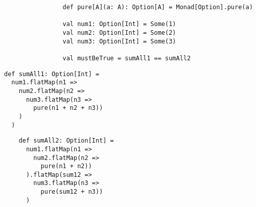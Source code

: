 \begin{algorithm}

    \begin{verbatim}
                def pure[A](a: A): Option[A] = Monad[Option].pure(a)
                
                val num1: Option[Int] = Some(1)
                val num2: Option[Int] = Some(2)
                val num3: Option[Int] = Some(3)
                
                val mustBeTrue = sumAll1 == sumAll2
    \end{verbatim}

    \begin{minipage}{0.40\textwidth}
    \begin{verbatim}
def sumAll1: Option[Int] = 
  num1.flatMap(n1 =>
    num2.flatMap(n2 =>
      num3.flatMap(n3 =>
        pure(n1 + n2 + n3))
    )
  )
    \end{verbatim}
    \end{minipage}
    \hspace{0.05\textwidth}
    \begin{minipage}{0.40\textwidth}
    \vspace{0.05\textwidth}
    \begin{verbatim}
    def sumAll2: Option[Int] =
      num1.flatMap(n1 =>
        num2.flatMap(n2 =>
          pure(n1 + n2))
      ).flatMap(sum12 =>
        num3.flatMap(n3 =>
          pure(sum12 + n3))
      )
    \end{verbatim}
    \end{minipage}

    \caption{Monad associativity law in Scala. %
    \label{monad:laws:associativity}}
\end{algorithm}